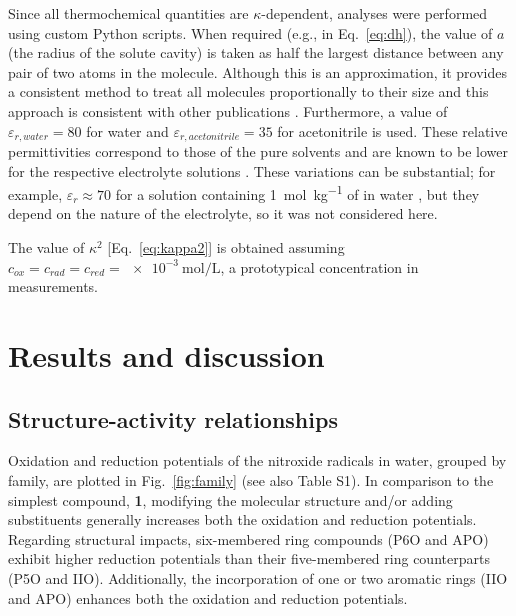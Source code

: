 \documentclass[review,preprint]{elsarticle}
\begin{document}
Since all thermochemical quantities are $\kappa$-dependent, analyses were performed using custom Python scripts. When required (e.g., in Eq.~\eqref{eq:dh}), the value of $a$ (the radius of the solute cavity) is taken as half the largest distance between any pair of two atoms in the molecule. Although this is an approximation, it provides a consistent method to treat all molecules proportionally to their size and this approach is consistent with other publications \cite{matsuiDensityFunctionalTheory2013}.  Furthermore, a value of $\varepsilon_{r,water}=80$ for water and $\varepsilon_{r,acetonitrile}=35$ for acetonitrile is used. These relative permittivities correspond to those of the pure solvents and are known to be lower for the respective electrolyte solutions \cite{silvaTrueHuckelEquation2022}. These variations can be substantial; for example, $\varepsilon_r \approx 70$ for a solution containing \SI{1}{\mol\per\kilo\gram} of  in water \cite{kontogeorgisDebyeHuckelTheoryIts2018, silvaTrueHuckelEquation2022}, but they depend on the nature of the electrolyte, so it was not considered here.

The value of $\kappa^2$  [Eq.~\eqref{eq:kappa2}] is obtained assuming  $c_{ox} = c_{rad} = c_ {red} = \SI{e-3}{\mole\per\liter}$, a prototypical concentration in measurements.


\section{Results and discussion} \label{sec:results}

\subsection{Structure-activity relationships} \label{sec:sar}

Oxidation and reduction potentials of the nitroxide radicals in water, grouped by family, are plotted in Fig.~\ref{fig:family} (see also Table S1). In comparison to the simplest compound, \textbf{1}, modifying the molecular structure and/or adding substituents generally increases both the oxidation and reduction potentials. Regarding structural impacts, six-membered ring compounds (P6O and APO) exhibit higher reduction potentials than their five-membered ring counterparts (P5O and IIO). Additionally, the incorporation of one or two aromatic rings (IIO and APO) enhances both the oxidation and reduction potentials.
\end{document}
